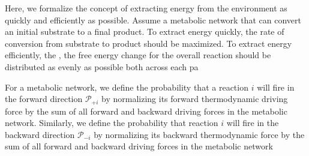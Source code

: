 Here, we formalize the concept of extracting energy from the environment as quickly and efficiently as possible. Assume a metabolic network that can convert an initial substrate to a final product. To extract energy quickly, the rate of conversion from substrate to product should be maximized.  To extract energy efficiently, the , the free energy change for the overall reaction should be distributed as evenly as possible both across each pa


For a metabolic network, we define the probability that a reaction $i$ will fire in the forward  direction ${\mathcal P_{+i}}$ by normalizing its forward thermodynamic driving force by the sum of all forward and backward driving forces in the metabolic network. Similarly, we define the probability that reaction $i$ will fire in the backward direction $\mathcal P_{-i}$ by normalizing its backward thermodynamic force by  the sum of all forward and backward driving forces in the metabolic network